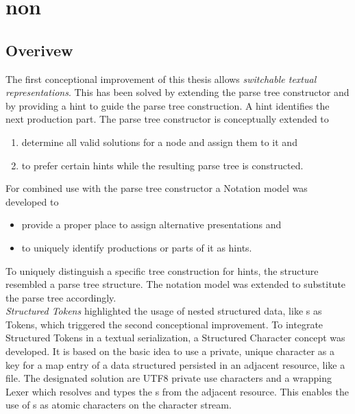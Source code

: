 \chapter{non}

\section{Overivew}

The first conceptional improvement of this thesis allows \emph{switchable textual representations}. This has been solved by extending the parse tree constructor and by providing a hint to guide the parse tree construction. A hint identifies the next production part.
The parse tree constructor is conceptually extended to
\begin{enumerate}
	\item determine all valid solutions for a node and assign them to it and
	\item to prefer certain hints while the resulting parse tree is constructed.
\end{enumerate}
For combined use with the parse tree constructor a Notation model was developed to
\begin{itemize}
	\item provide a proper place to assign alternative presentations and
	\item to uniquely identify productions or parts of it as hints.
\end{itemize}
To uniquely distinguish a specific tree construction for hints, the structure resembled a parse tree structure. The notation model was extended to substitute the parse tree accordingly.\\


\emph{Structured Tokens} highlighted the usage of nested structured data, like s as Tokens, which triggered the second conceptional improvement. To integrate Structured Tokens in a textual serialization, a Structured Character concept was developed. It is based on the basic idea to use a private, unique character as a key for a map entry of a data structured persisted in an adjacent resource, like a file. The designated solution are UTF8 private use characters and a wrapping Lexer which resolves and types the s from the adjacent resource. This enables the use of s as atomic characters on the character stream. \\

